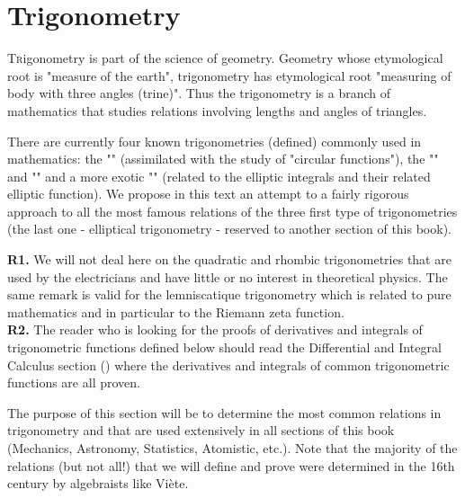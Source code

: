 	\newpage
	\thispagestyle{empty}
	\mbox{}
	\section{Trigonometry}\label{trigonometry}
	\lettrine[lines=4]{\color{BrickRed}T}rigonometry is part of the science of geometry. Geometry whose etymological root is "measure of the earth", trigonometry has etymological root "measuring of body with three angles (trine)". Thus the trigonometry is a branch of mathematics that studies relations involving lengths and angles of triangles.
	
	There are currently four known trigonometries (defined) commonly used in mathematics: the "" (assimilated with the study of "circular functions"), the  "" and  "" and a more exotic "" (related to the elliptic integrals and their related elliptic function). We propose in this text an attempt to a fairly rigorous approach to all the most famous relations of the three first type of trigonometries (the last one - elliptical trigonometry - reserved to another section of this book).
	
	\begin{tcolorbox}[title=Remarks,colframe=black,arc=10pt]
	\textbf{R1.} We will not deal here on the quadratic and rhombic trigonometries that are used by the electricians and have little or no interest in theoretical physics. The same remark is valid for the lemniscatique trigonometry which is related to pure mathematics and in particular to the Riemann zeta function.\\
	
	\textbf{R2.} The reader who is looking for the proofs of derivatives and integrals of trigonometric functions defined below should read the Differential and Integral Calculus section () where the derivatives and integrals of common trigonometric functions are all proven.
	\end{tcolorbox}	

	The purpose of this section will be to determine the most common relations in trigonometry and that are used extensively in all sections of this book (Mechanics, Astronomy, Statistics, Atomistic, etc.). Note that the majority of the relations (but not all!) that we will define and prove were determined in the 16th century by algebraists like Viète.

